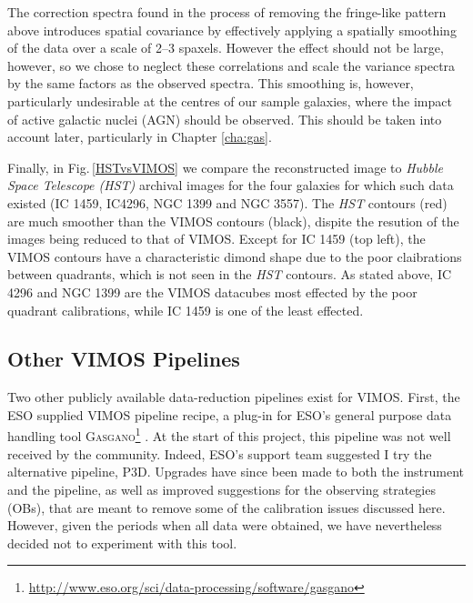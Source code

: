 		The correction spectra found in the process of removing the fringe-like pattern above introduces spatial covariance by effectively applying a spatially smoothing of the data over a scale of 2--3 spaxels. However the effect should not be large, however, so we chose to neglect these correlations and scale the variance spectra by the same factors as the observed spectra. This smoothing is, however, particularly undesirable at the centres of our sample galaxies, where the impact of active galactic nuclei (AGN) should be observed. This should be taken into account later, particularly in Chapter \ref{cha:gas}.

		Finally, in Fig.\,\ref{HSTvsVIMOS} we compare the reconstructed image to \textit{Hubble Space Telescope (HST)} archival images for the four galaxies for which such data existed (IC 1459, IC4296, NGC 1399 and NGC 3557). The \textit{HST} contours (red) are much smoother than the VIMOS contours (black), dispite the resution of the  images being reduced to that of VIMOS. Except for IC 1459 (top left), the VIMOS contours have a characteristic dimond shape due to the poor claibrations between quadrants, which is not seen in the \textit{HST} contours. As stated above, IC 4296 and NGC 1399 are the VIMOS datacubes most effected by the poor quadrant calibrations, while IC 1459 is one of the least effected.

		


	\subsection{Other VIMOS Pipelines}
		\label{subsec:Other}
		Two other publicly available data-reduction pipelines exist for VIMOS. First, the ESO supplied VIMOS pipeline recipe, a plug-in for ESO's general purpose data handling tool \textsc{Gasgano}\footnote{\url{http://www.eso.org/sci/data-processing/software/gasgano}} \citep{Izzo2004, ESO2012}. At the start of this project, this pipeline was not well received by the community. Indeed, ESO's support team suggested I try the alternative pipeline, \textsc{P3D}. Upgrades have since been made to both the instrument and the pipeline, as well as improved suggestions for the observing strategies (OBs), that are meant to remove some of the calibration issues discussed here. However, given the periods when all data were obtained, we have nevertheless decided not to experiment with this tool.
		
